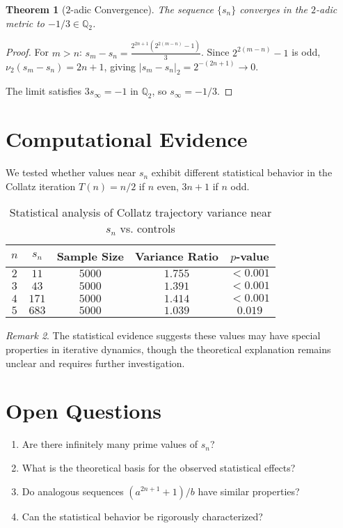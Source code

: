 \documentclass[11pt]{article}
\newtheorem{theorem}{Theorem}
\theoremstyle{remark}
\newtheorem{remark}[theorem]{Remark}
\begin{document}
\begin{theorem}[$2$-adic Convergence]
The sequence $\{s_n\}$ converges in the $2$-adic metric to $-1/3 \in \mathbb{Q}_2$.
\end{theorem}

\begin{proof}
For $m > n$: $s_m - s_n = \frac{2^{2n+1}(2^{2(m-n)} - 1)}{3}$. Since $2^{2(m-n)} - 1$ is odd, $\nu_2(s_m - s_n) = 2n + 1$, giving $|s_m - s_n|_2 = 2^{-(2n+1)} \to 0$.

The limit satisfies $3s_\infty = -1$ in $\mathbb{Q}_2$, so $s_\infty = -1/3$.
\end{proof}

\section{Computational Evidence}

We tested whether values near $s_n$ exhibit different statistical behavior in the Collatz iteration $T(n) = n/2$ if $n$ even, $3n+1$ if $n$ odd.

\begin{table}[h]
\centering
\begin{tabular}{@{}ccccc@{}}
\toprule
$n$ & $s_n$ & Sample Size & Variance Ratio & $p$-value \\
\midrule
$2$ & $11$ & $5000$ & $1.755$ & $<0.001$ \\
$3$ & $43$ & $5000$ & $1.391$ & $<0.001$ \\
$4$ & $171$ & $5000$ & $1.414$ & $<0.001$ \\
$5$ & $683$ & $5000$ & $1.039$ & $0.019$ \\
\bottomrule
\end{tabular}
\caption{Statistical analysis of Collatz trajectory variance near $s_n$ vs. controls}
\end{table}

\begin{remark}
The statistical evidence suggests these values may have special properties in iterative dynamics, though the theoretical explanation remains unclear and requires further investigation.
\end{remark}

\section{Open Questions}

\begin{enumerate}
\item Are there infinitely many prime values of $s_n$?
\item What is the theoretical basis for the observed statistical effects?
\item Do analogous sequences $(a^{2n+1} + 1)/b$ have similar properties?
\item Can the statistical behavior be rigorously characterized?
\end{enumerate}
\end{document}
